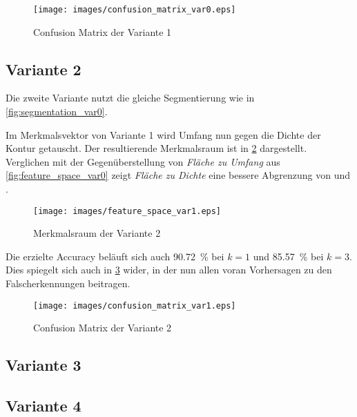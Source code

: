 \begin{figure}[ht]
    \centering
    \texttt{[image: images/confusion\_matrix\_var0.eps]}
    \caption{\foreignlanguage{english}{Confusion Matrix} der Variante 1\label{fig:confusion_matrix_var0}}
\end{figure}

\FloatBarrier{}

\subsection{Variante 2}

Die zweite Variante nutzt die gleiche Segmentierung wie in \cref{fig:segmentation_var0}.

Im Merkmalsvektor von Variante 1 wird Umfang nun gegen die Dichte der Kontur getauscht. Der resultierende Merkmalsraum ist in \cref{fig:feature_space_var1} dargestellt. Verglichen mit der Gegenüberstellung von \emph{Fläche zu Umfang} aus \cref{fig:feature_space_var0} zeigt \emph{Fläche zu Dichte} eine bessere Abgrenzung von  und .

\begin{figure}[ht]
    \centering
    \texttt{[image: images/feature\_space\_var1.eps]}
    \caption{Merkmalsraum der Variante 2\label{fig:feature_space_var1}}
\end{figure}

Die erzielte \foreignlanguage{english}{Accuracy} beläuft sich auch \SI{90.72}{\percent} bei \(k = 1\) und \SI{85.57}{\percent} bei \(k = 3\). Dies spiegelt sich auch in \cref{fig:confusion_matrix_var1} wider, in der nun allen voran  Vorhersagen zu den Falscherkennungen beitragen.

\begin{figure}[ht]
    \centering
    \texttt{[image: images/confusion\_matrix\_var1.eps]}
    \caption{\foreignlanguage{english}{Confusion Matrix} der Variante 2\label{fig:confusion_matrix_var1}}
\end{figure}

\FloatBarrier{}

\subsection{Variante 3}

\FloatBarrier{}

\subsection{Variante 4}
